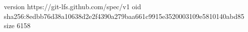 version https://git-lfs.github.com/spec/v1
oid sha256:8edbb76d38a10638d2e2f4390a279baa661c9915e3520003109e5810140abd85
size 6158
